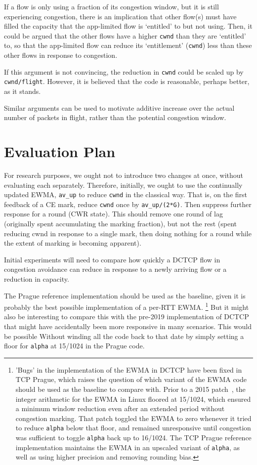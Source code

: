 If a flow is only using a fraction of its congestion window, but it is still
experiencing congestion, there is an implication that other flow(s) must have
filled the capacity that the app-limited flow is `entitled' to but not using.
Then, it could be argued that the other flows have a higher \texttt{cwnd} than
they are `entitled' to, so that the app-limited flow can reduce its
`entitlement' (\texttt{cwnd}) less than these other flows in response to
congestion.

If this argument is not convincing, the reduction in \texttt{cwnd} could be
scaled up by \texttt{cwnd/flight}. However, it is believed that the code is
reasonable, perhaps better, as it stands.

Similar arguments can be used to motivate additive increase over the actual
number of packets in flight, rather than the potential congestion window.

\section{Evaluation Plan}\label{prresp_Evaluation}

For research purposes, we ought not to introduce two changes at once, without
evaluating each separately. Therefore, initially, we ought to use the
continually updated EWMA, \texttt{av\_up} to reduce \texttt{cwnd} in the
classical way. That is, on the first feedback of a CE mark, reduce \texttt{cwnd}
once by \texttt{av\_up/(2*G)}. Then suppress further response for a round (CWR
state). This should remove one round of lag (originally spent accumulating the
marking fraction), but not the rest (spent reducing cwnd in response to a single
mark, then doing nothing for a round while the extent of marking is becoming
apparent).

Initial experiments will need to compare how quickly a DCTCP flow in congestion
avoidance can reduce in response to a newly arriving flow or a reduction in
capacity.

The Prague reference implementation should be used as the baseline, given it is
probably the best possible implementation of a per-RTT EWMA.%
%
\footnote{'Bugs' in the implementation of the EWMA in DCTCP have been fixed in
	TCP Prague, which raises the question of which variant of the EWMA code should
	be used as the baseline to compare with. Prior to a 2015
	patch~\cite{shewmaker15:Linux_DCTCP_EWMA}, the integer arithmetic for the EWMA
	in Linux floored at 15/1024, which ensured a minimum window reduction even after
	an extended period without congestion marking. That patch toggled the EWMA to
	zero whenever it tried to reduce \texttt{alpha} below that floor, and remained
	unresponsive until congestion was sufficient to toggle \texttt{alpha} back up to
	16/1024. The TCP Prague reference implementation maintains the EWMA in an
	upscaled variant of \texttt{alpha}, as well as using higher precision and
	removing rounding bias.}%
%
But it might also be interesting to compare this with the pre-2019
implementation of DCTCP that might have accidentally been more responsive in
many scenarios. This would be possible Without winding all the code back to that
date by simply setting a floor for \texttt{alpha} at 15/1024 in the Prague code.

